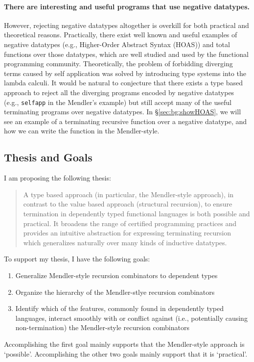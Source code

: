 \documentclass[letterpaper,12pt]{article}
\newcommand{\TheThesis}{
A type based approach (in particular, the Mendler-style approach),
in contrast to the value based approach (structural recursion),
to ensure termination in dependently typed functional languages
is both possible and practical.
It broadens the range of certified programming practices
and provides an intuitive abstraction for expressing terminating recursion
which generalizes naturally over many kinds of inductive datatypes.
}
\newcommand{\eg}[0]{e.g., }
\newcommand{\ie}[0]{i.e., }
\begin{document}
\paragraph{There are interesting and useful programs
that use negative datatypes.}
However, rejecting negative datatypes altogether is overkill
for both practical and theoretical reasons.
Practically, there exist well known and useful examples of negative datatypes
(\eg Higher-Order Abstract Syntax (HOAS)) and total functions over
those datatypes, which are well studied and used by the
functional programming community.
Theoretically, the problem of forbidding diverging terms caused by self
application was solved by introducing type systems into the lambda calculi.
It would be natural to conjecture that there exists a type based approach
to reject all the diverging programs encoded by negative datatypes
(\eg \verb|selfapp| in the Mendler's example) but still accept many of
the useful terminating programs over negative datatypes.
In \S\ref{sec:bg:showHOAS}, we will see an example of
a terminating recursive function over a negative datatype,
and how we can write the function in the Mendler-style.

\subsection{Thesis and Goals} \label{sec:intro:thesis}
I am proposing the following thesis:
\begin{quote}\TheThesis\end{quote}
To support my thesis, I have the following goals:
\newcommand{\Goals}[0]{
\begin{enumerate}[~~~\text{Goal} 1.]
 \item Generalize Mendler-style recursion combinators to dependent types
 \item Organize the hierarchy of the Mendler-stlye recursion combinators
 \item Identify which of the features,
       commonly found in dependently typed languages,
       interact smoothly with or
       conflict against (\ie potentially causing non-termination)
       the Mendler-style recursion combinators
\end{enumerate}
}\Goals
Accomplishing the first goal mainly supports that the Mendler-style approach
is `possible'. Accomplishing the other two goals mainly support that it is
`practical'.
\end{document}
